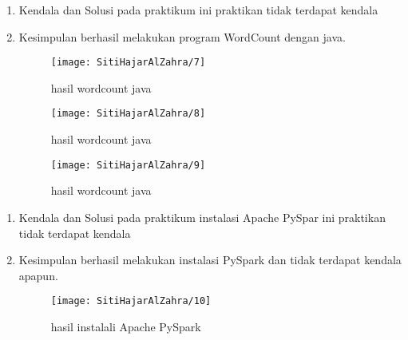 \begin{enumerate}
\item Kendala dan Solusi
\newline pada praktikum ini praktikan tidak terdapat kendala 

\item Kesimpulan
\newline berhasil melakukan program WordCount dengan java.
\begin{figure}[!ht]
\texttt{[image: SitiHajarAlZahra/7]}
\caption{hasil wordcount java}
\label{gam:Hasil}
\end{figure}

\begin{figure}[!ht]
\texttt{[image: SitiHajarAlZahra/8]}
\caption{hasil wordcount java}
\label{gam:Hasil}
\end{figure}

\begin{figure}[!ht]
\texttt{[image: SitiHajarAlZahra/9]}
\caption{hasil wordcount java}
\label{gam:Hasil}
\end{figure}
\end{enumerate}

\begin{enumerate}
\item Kendala dan Solusi
\newline pada praktikum instalasi Apache PySpar ini praktikan tidak terdapat kendala 

\item Kesimpulan
\newline berhasil melakukan instalasi PySpark dan tidak terdapat kendala apapun.
\begin{figure}[!ht]
\texttt{[image: SitiHajarAlZahra/10]}
\caption{hasil instalali Apache PySpark}
\label{gam:Hasil}
\end{figure}
\end{enumerate}
